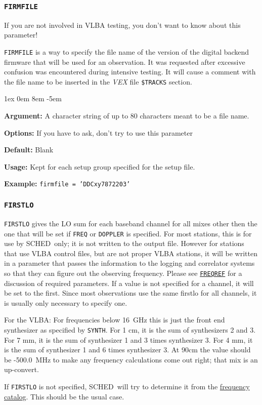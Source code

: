 \documentclass{report}
\newcommand{\schedb}{{\sc SCHED~}}
\newcommand{\rcwbox}[5]{
  \begin{list}{}{\parsep 1ex  \itemsep 0em
                 \leftmargin 8em  \itemindent -5em }
    \item {\bf Argument:} #1
    \item {\bf Options:}  #2
    \item {\bf Default:}  #3
    \item {\bf Usage:}    #4
    \item {\bf Example:}  #5
  \end{list}
}
\begin{document}
\subsubsection{\label{SP:FIRMFILE}{\tt FIRMFILE}}

If you are not involved in VLBA testing, you don't want to know about
this parameter!

{\tt FIRMFILE} is a way to specify the file name of the version of the 
digital backend firmware that will be used for an observation.  It
was requested after excessive confusion was encountered during 
intensive testing.  It will cause a comment with the file name to 
be inserted in the {\sl VEX} file {\tt \$TRACKS} section.

\rcwbox
{A character string of up to 80 characters meant to be a file name.}
{If you have to ask, don't try to use this parameter}
{Blank}
{Kept for each setup group specified for the setup file.}
{{\tt firmfile = 'DDCxy7872203'}}


\subsubsection{\label{SP:FIRSTLO}{\tt FIRSTLO}}

{\tt FIRSTLO} gives the LO sum for each baseband channel for all mixes
other then the one that will be set if {\tt FREQ} or {\tt DOPPLER} is
specified.  For most stations, this is for use by \schedb only; it
is not written to the output file.  However for stations that use VLBA
control files, but are not proper VLBA stations, it will be written in
a parameter that passes the information to the logging and correlator
systems so that they can figure out the observing frequency.  Please
see 
{\hyperref[SP:FREQREF]{{\tt FREQREF}}} for a discussion of required
parameters.  If a value is not specified for a channel, it will be
set to the first.  Since most observations use the same firstlo
for all channels, it is usually only necessary to specify one.

For the VLBA: For frequencies below 16~GHz this is just the front end
synthesizer as specified by {\tt SYNTH}.  For 1 cm, it is the sum of
synthesizers 2 and 3.  For 7 mm, it is the sum of synthesizer 1 and 3
times synthesizer 3.  For 4 mm, it is the sum of synthesizer 1 and 6
times synthesizer 3.  At 90cm the value should be -500.0~MHz to make
any frequency calculations come out right; that mix is an up-convert.

If {\tt FIRSTLO} is not specified, \schedb will try to determine it
from the 
{\hyperref[SEC:FRQCAT]{frequency catalog}}.  This should be
the usual case.
\end{document}
